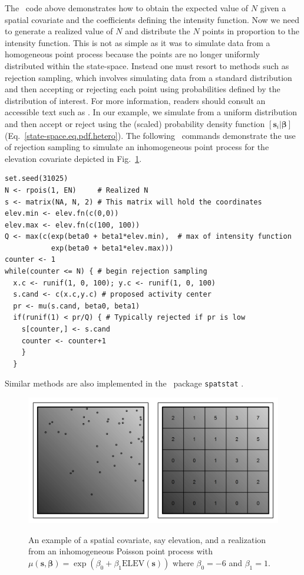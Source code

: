 The \R~code above demonstrates how to obtain the expected value
of $N$ given a spatial covariate and the coefficients defining the
intensity function. Now we need to generate a realized value of $N$
and distribute the $N$ points in proportion to the intensity
function. This is not as simple as it was to simulate data from a homogeneous point process
because the points are no longer uniformly distributed within the
state-space. Instead one must resort to methods such as rejection sampling, which involves
simulating data from a standard distribution and then accepting or
rejecting each point using probabilities defined by the distribution
of interest. For more information, readers should consult an
accessible text such as \citet{robert_casella:2010}. In our example, we
simulate from a uniform distribution and then accept or reject using
the (scaled) probability density function
$[\mathbf{s}_i | \bm{\beta}]$
(Eq.~\ref{state-space.eq.pdf.hetero}). The following \R~commands
demonstrate the use of
rejection sampling to simulate an inhomogeneous point process for the
elevation covariate depicted in
Fig.~\ref{state-space.fig.hetero}.
  \begin{small}
\begin{verbatim}
set.seed(31025)
N <- rpois(1, EN)     # Realized N
s <- matrix(NA, N, 2) # This matrix will hold the coordinates
elev.min <- elev.fn(c(0,0))
elev.max <- elev.fn(c(100, 100))
Q <- max(c(exp(beta0 + beta1*elev.min),  # max of intensity function
           exp(beta0 + beta1*elev.max)))
counter <- 1
while(counter <= N) { # begin rejection sampling
  x.c <- runif(1, 0, 100); y.c <- runif(1, 0, 100)
  s.cand <- c(x.c,y.c) # proposed activity center
  pr <- mu(s.cand, beta0, beta1)
  if(runif(1) < pr/Q) { # Typically rejected if pr is low
    s[counter,] <- s.cand
    counter <- counter+1
    }
  }
\end{verbatim}
  \end{small}
Similar methods are also
implemented in the \R~package \texttt{spatstat} \citep{baddeley_turner:2005}.
\begin{figure}%
\centering
\includegraphics[width=\textwidth]{Ch11/figs/heteroPlots}
\label{state-space.fig.hetero}
\caption{An example of a spatial covariate, say elevation, and a
  realization from an inhomogeneous Poisson point process with
  $\mu(\mathbf{s}, \bm{\beta}) = \exp(\beta_0 + \beta_1
  \mbox{ELEV}(\mathbf{s}))$ where $\beta_0=-6$ and $\beta_1=1$.}
\end{figure}

